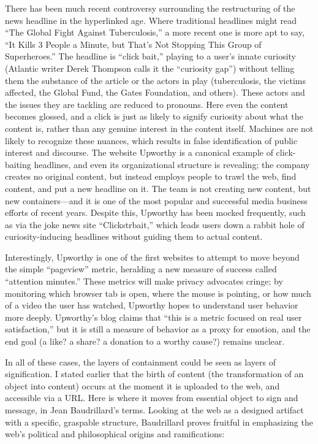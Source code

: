 There has been much recent controversy surrounding the restructuring of the news headline in the hyperlinked age. Where traditional headlines might read ``The Global Fight Against Tuberculosis,'' a more recent one is more apt to say, ``It Kills 3 People a Minute, but That's Not Stopping This Group of Superheroes.''  The headline is ``click bait,'' playing to a user's innate curiosity (Atlantic writer Derek Thompson calls it the ``curiosity gap'')  without telling them the substance of the article or the actors in play (tuberculosis, the victims affected, the Global Fund, the Gates Foundation, and others). These actors and the issues they are tackling are reduced to pronouns. Here even the content becomes glossed, and a click is just as likely to signify curiosity about what the content is, rather than any genuine interest in the content itself. Machines are not likely to recognize these nuances, which results in false identification of public interest and discourse. The website Upworthy is a canonical example of click-baiting headlines, and even its organizational structure is revealing; the company creates no original content, but instead employs people to trawl the web, find content, and put a new headline on it. The team is not creating new content, but new containers—and it is one of the most popular and successful media business efforts of recent years. Despite this, Upworthy has been mocked frequently, such as via the joke news site ``Clickstrbait,'' which leads users down a rabbit hole of curiosity-inducing headlines without guiding them to actual content.

Interestingly, Upworthy is one of the first websites to attempt to move beyond the simple ``pageview'' metric, heralding a new measure of success called ``attention minutes.'' These metrics will make privacy advocates cringe; by monitoring which browser tab is open, where the mouse is pointing, or how much of a video the user has watched, Upworthy hopes to understand user behavior more deeply. Upworthy's blog claims that ``this is a metric focused on real user satisfaction,'' but it is still a measure of behavior as a proxy for emotion, and the end goal (a like? a share? a donation to a worthy cause?) remains unclear. 

In all of these cases, the layers of containment could be seen as layers of signification. I stated earlier that the birth of content (the transformation of an object into content) occurs at the moment it is uploaded to the web, and accessible via a URL. Here is where it moves from essential object to sign and message, in Jean Baudrillard's terms. Looking at the web as a designed artifact with a specific, graspable structure, Baudrillard proves fruitful in emphasizing the web's political and philosophical origins and ramifications:

